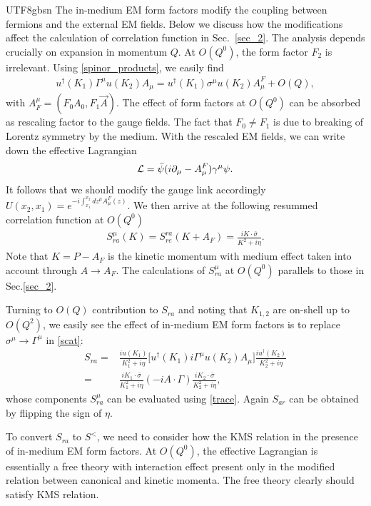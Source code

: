 \documentclass[11pt]{article}\def\baselinestretch{1.4}
\def\g{{\gamma}}
\def\G{{\Gamma}}
\def\h{\eta}
\def\m{{\mu}}
\def\s{{\sigma}}
\newcommand{\pd}{{\partial}}
\newcommand{\dg}{\dagger}
\begin{document}
\begin{CJK}{UTF8}{gbsn}
The in-medium EM form factors modify the coupling between fermions and the external EM fields. Below we discuss how the modifications affect the calculation of correlation function in Sec.~\ref{sec_2}. The analysis depends crucially on expansion in momentum $Q$.
At $O(Q^0)$, the form factor $F_2$ is irrelevant. Using \eqref{spinor_products}, we easily find
\begin{align}
u^\dg(K_1)\G^\m u(K_2)A_\m=u^\dg(K_1)\s^\m u(K_2)A^F_\m+O(Q),
\end{align}
with $A_F^\m=(F_0 A_0,F_1 \vec{A})$. The effect of form factors at $O(Q^0)$ can be absorbed as rescaling factor to the gauge fields. The fact that $F_0\ne F_1$ is due to breaking of Lorentz symmetry by the medium. With the rescaled EM fields, we can write down the effective Lagrangian
\begin{align}\label{Lag_F}
{\cal L}=\bar{\psi}(i\pd_\m-A^F_\m)\g^\m\psi.
\end{align}
It follows that we should modify the gauge link accordingly $U(x_2,x_1)=e^{-i\int_{x_1}^{x_2} dz^\m A^F_\m(z)}$.
We then arrive at the following resummed correlation function at $O(Q^0)$
\begin{align}
S_{ra}^\m(K)=S_{re}^{ra}(K+A_F)=\frac{iK\cdot\bar{\s}}{K^2+i\h}.
\end{align}
Note that $K=P-A_F$ is the kinetic momentum with medium effect taken into account through $A\to A_F$. The calculations of $S_{ra}^\m$ at $O(Q^0)$ parallels to those in Sec.\ref{sec_2}.

Turning to $O(Q)$ contribution to $S_{ra}$ and noting that $K_{1,2}$ are on-shell up to $O(Q^2)$, we easily see the effect of in-medium EM form factors is to replace $\s^\m\to\G^\m$ in \eqref{scat}:
\begin{align}\label{S_ra_EM form factors}
S_{ra}=&\frac{iu(K_1)}{K_1^2+i\h}\big[u^\dg(K_1) i\G^\m u(K_2)A_\m\big]\frac{iu^\dg(K_2)}{K_2^2+i\h}\nonumber\\
=&\frac{iK_1\cdot\bar{\s}}{K_1^2+i\h}(-i A\cdot\G)\frac{iK_2\cdot\bar{\s}}{K_2^2+i\h},
\end{align}
whose components $S_{ra}^\m$ can be evaluated using \eqref{trace}. Again $S_{ar}$ can be obtained by flipping the sign of $\h$.

To convert $S_{ra}$ to $S^<$, we need to consider how the KMS relation in the presence of in-medium EM form factors. At $O(Q^0)$, the effective Lagrangian is essentially a free theory with interaction effect present only in the modified relation between canonical and kinetic momenta. The free theory clearly should satisfy KMS relation.


\end{CJK}
\end{document}
